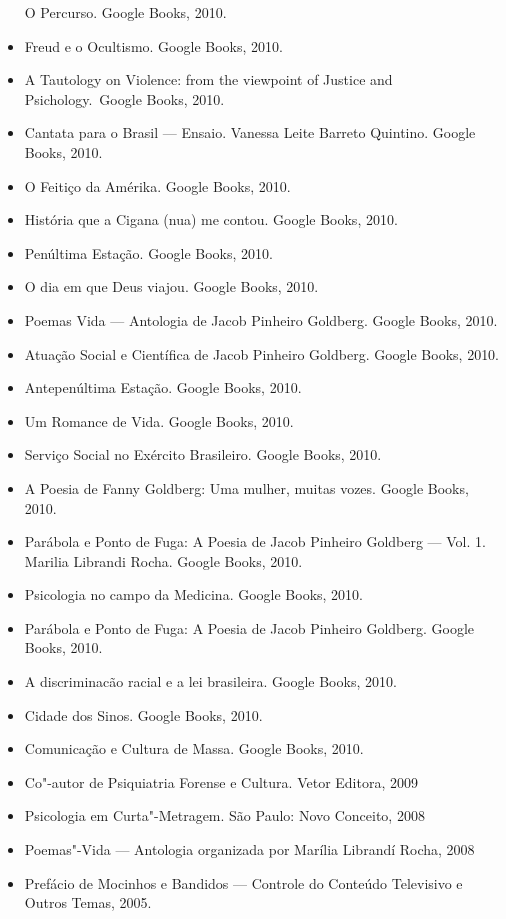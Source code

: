 \begin{itemize}
  O Percurso. Google Books, 2010.
\item
  Freud e o Ocultismo. Google Books, 2010.
\item
  A Tautology on Violence: from the viewpoint of Justice and
  Psichology.~Google Books, 2010.
\item
  Cantata para o Brasil --- Ensaio. Vanessa Leite Barreto Quintino.
  Google Books, 2010.
\item
  O Feitiço da Amérika. Google Books, 2010.
\item
  História que a Cigana (nua) me contou. Google Books, 2010.
\item
  Penúltima Estação. Google Books, 2010.
\item
  O dia em que Deus viajou. Google Books, 2010.
\item
  Poemas Vida --- Antologia de Jacob Pinheiro Goldberg. Google Books,
  2010.
\item
  Atuação Social e Científica de Jacob Pinheiro Goldberg. Google Books,
  2010.
\item
  Antepenúltima Estação. Google Books, 2010.
\item
  Um Romance de Vida. Google Books, 2010.
\item
  Serviço Social no Exército Brasileiro. Google Books, 2010.
\item
  A Poesia de Fanny Goldberg: Uma mulher, muitas vozes. Google Books,
  2010.
\item
  Parábola e Ponto de Fuga: A Poesia de Jacob Pinheiro Goldberg --- Vol.
  1. Marilia Librandi Rocha. Google Books, 2010.
\item
  Psicologia no campo da Medicina. Google Books, 2010.
\item
  Parábola e Ponto de Fuga: A Poesia de Jacob Pinheiro Goldberg. Google
  Books, 2010.
\item
  A discriminacão racial e a lei brasileira. Google Books, 2010.
\item
  Cidade dos Sinos. Google Books, 2010.
\item
  Comunicação e Cultura de Massa. Google Books, 2010.
\item
  Co"-autor de Psiquiatria Forense e Cultura. Vetor Editora, 2009
\item
  Psicologia em Curta"-Metragem. São Paulo: Novo Conceito, 2008
\item
  Poemas"-Vida --- Antologia organizada por Marília Librandí Rocha, 2008
\item
  Prefácio de Mocinhos e Bandidos --- Controle do Conteúdo Televisivo e
  Outros Temas, 2005.

\end{itemize}
